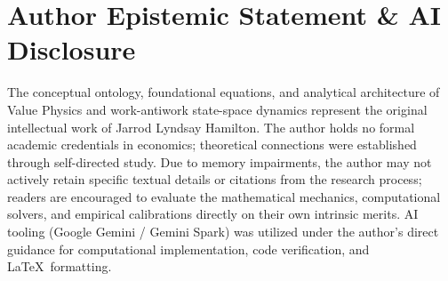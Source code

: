\documentclass[preprint,12pt,authoryear]{elsarticle}
\theoremstyle{definition}
\begin{document}
\section*{Author Epistemic Statement \& AI Disclosure}
The conceptual ontology, foundational equations, and analytical architecture of Value Physics and work-antiwork state-space dynamics represent the original intellectual work of Jarrod Lyndsay Hamilton. The author holds no formal academic credentials in economics; theoretical connections were established through self-directed study. Due to memory impairments, the author may not actively retain specific textual details or citations from the research process; readers are encouraged to evaluate the mathematical mechanics, computational solvers, and empirical calibrations directly on their own intrinsic merits. AI tooling (Google Gemini / Gemini Spark) was utilized under the author's direct guidance for computational implementation, code verification, and \LaTeX\ formatting.



\end{document}
